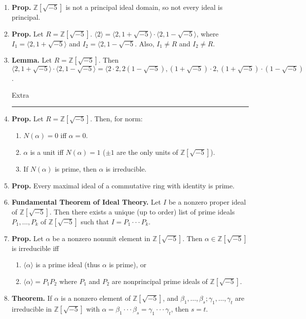 \begin{enumerate}
	\item \textbf{Prop. } $\mathbb{Z}[\sqrt{-5}]$ is not a principal ideal domain, so not every ideal is principal. 
	\item \textbf{Prop. } Let $R = \mathbb{Z}[\sqrt{-5}]$. $\langle 2 \rangle = \langle 2,1+\sqrt{-5} \rangle \cdot \langle 2, 1-\sqrt{-5} \rangle$, where $I_1 = \langle 2,1+\sqrt{-5} \rangle$ and $I_2 = \langle 2,1-\sqrt{-5}$. Also, $I_1 \neq R$ and $I_2 \neq R$. 
	\item \textbf{Lemma. } Let $R = \mathbb{Z}[\sqrt{-5}]$. Then $\langle 2,1+\sqrt{-5} \rangle \cdot \langle 2,1-\sqrt{-5} \rangle = \langle 2 \cdot 2, 2(1-\sqrt{-5}), (1+\sqrt{-5}) \cdot 2, (1+\sqrt{-5}) \cdot (1 - \sqrt{-5})$. 
	\begin{center}
		Extra \\
		\hrule 
	\end{center}
	\item \textbf{Prop. } Let $R = \mathbb{Z}[\sqrt{-5}]$. Then, for norm: 
	\begin{enumerate}
		\item $N(\alpha) = 0$ iff $\alpha = 0$. 
		\item $\alpha$ is a unit iff $N(\alpha)=1$ ($\pm 1$ are the only units of $\mathbb{Z}[\sqrt{-5}]$). 
		\item If $N(\alpha)$ is prime, then $\alpha$ is irreducible. 
	\end{enumerate}
	\item \textbf{Prop. } Every maximal ideal of a commutative ring with identity is prime. 
	\item \textbf{Fundamental Theorem of Ideal Theory. } Let $I$ be a nonzero proper ideal of $\mathbb{Z}[\sqrt{-5}]$. Then there exists a unique (up to order) list of prime ideals $P_1,\dots,P_k$ of $\mathbb{Z}[\sqrt{-5}]$ such that $I = P_1 \cdot \cdot \cdot P_k$. 
	\item \textbf{Prop. } Let $\alpha$ be a nonzero nonunit element in $\mathbb{Z}[\sqrt{-5}]$. Then $\alpha \in \mathbb{Z}[\sqrt{-5}]$ is irreducible iff 
	\begin{enumerate}
		\item $\langle \alpha \rangle$ is a prime ideal (thus $\alpha$ is prime), or
		\item $\langle \alpha \rangle = P_1P_2$ where $P_1$ and $P_2$ are nonprincipal prime ideals of $\mathbb{Z}[\sqrt{-5}]$. 
	\end{enumerate}
	\item \textbf{Theorem. } If $\alpha$ is a nonzero element of $\mathbb{Z}[\sqrt{-5}]$, and $\beta_1,\dots,\beta_s; \gamma_1,\dots,\gamma_t$ are irreducible in $\mathbb{Z}[\sqrt{-5}]$ with $\alpha = \beta_1 \cdot \cdot \cdot \beta_s = \gamma_1 \cdot \cdot \cdot \gamma_t$, then $s=t$. 

\end{enumerate}
